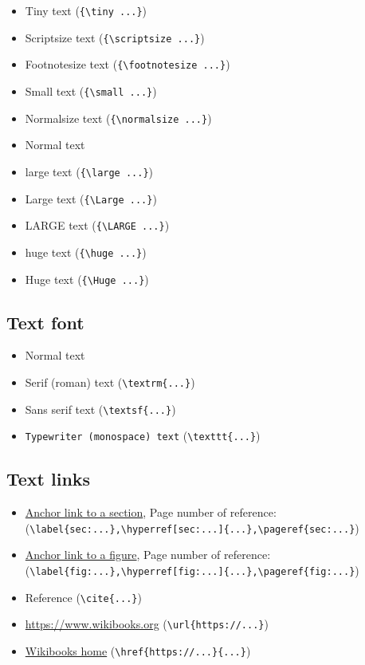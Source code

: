 \documentclass{article}				%
\begin{document}
\begin{itemize}
	\item {\tiny Tiny text} (\verb|{\tiny ...}|)
	\item {\scriptsize Scriptsize text} (\verb|{\scriptsize ...}|)
	\item {\footnotesize Footnotesize text} (\verb|{\footnotesize ...}|)
	\item {\small Small text} (\verb|{\small ...}|)
	\item {\normalsize Normalsize text} (\verb|{\normalsize ...}|)
	\item Normal text
	\item {\large large text} (\verb|{\large ...}|)
	\item {\Large Large text} (\verb|{\Large ...}|)
	\item {\LARGE LARGE text} (\verb|{\LARGE ...}|)
	\item {\huge huge text} (\verb|{\huge ...}|)
	\item {\Huge Huge text} (\verb|{\Huge ...}|)
\end{itemize}

\subsection{Text font}

\begin{itemize}
	\item Normal text
	\item \textrm{Serif (roman) text} (\verb|\textrm{...}|)
	\item \textsf{Sans serif text} (\verb|\textsf{...}|)
	\item \texttt{Typewriter (monospace) text} (\verb|\texttt{...}|)
\end{itemize}

\subsection{Text links}

\begin{itemize}
	\item \hyperref[sec:exampleAnchor]{Anchor link to a section}, Page number of reference: \pageref{sec:exampleAnchor} \\(\verb|\label{sec:...},\hyperref[sec:...]{...},\pageref{sec:...}|)
	\item \hyperref[fig:pixelGraphic]{Anchor link to a figure}, Page number of reference: \pageref{fig:pixelGraphic} \\(\verb|\label{fig:...},\hyperref[fig:...]{...},\pageref{fig:...}|)
	\item Reference\cite{source01,source02} (\verb|\cite{...}|)
	\item \url{https://www.wikibooks.org} (\verb|\url{https://...}|)
	\item \href{https://www.wikibooks.org}{Wikibooks home} (\verb|\href{https://...}{...}|)
\end{itemize}
\end{document}
